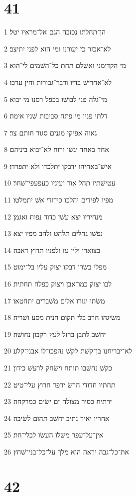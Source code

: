\chapter{41}

\par 1 הן־תחלתו נכזבה הגם אל־מראיו יטל׃
\par 2 לא־אכזר כי יעורנו ומי הוא לפני יתיצב׃
\par 3 מי הקדימני ואשׁלם תחת כל־השׁמים לי־הוא׃
\par 4 לא־אחרישׁ בדיו ודבר־גבורות וחין ערכו׃
\par 5 מי־גלה פני לבושׁו בכפל רסנו מי יבוא׃
\par 6 דלתי פניו מי פתח סביבות שׁניו אימה׃
\par 7 גאוה אפיקי מגנים סגור חותם צר׃
\par 8 אחד באחד יגשׁו ורוח לא־יבוא ביניהם׃
\par 9 אישׁ־באחיהו ידבקו יתלכדו ולא יתפרדו׃
\par 10 עטישׁתיו תהל אור ועיניו כעפעפי־שׁחר׃
\par 11 מפיו לפידים יהלכו כידודי אשׁ יתמלטו׃
\par 12 מנחיריו יצא עשׁן כדוד נפוח ואגמן׃
\par 13 נפשׁו גחלים תלהט ולהב מפיו יצא׃
\par 14 בצוארו ילין עז ולפניו תדוץ דאבה׃
\par 15 מפלי בשׂרו דבקו יצוק עליו בל־ימוט׃
\par 16 לבו יצוק כמו־אבן ויצוק כפלח תחתית׃
\par 17 משׂתו יגורו אלים משׁברים יתחטאו׃
\par 18 משׂיגהו חרב בלי תקום חנית מסע ושׁריה׃
\par 19 יחשׁב לתבן ברזל לעץ רקבון נחושׁה׃
\par 20 לא־יבריחנו בן־קשׁת לקשׁ נהפכו־לו אבני־קלע׃
\par 21 כקשׁ נחשׁבו תותח וישׂחק לרעשׁ כידון׃
\par 22 תחתיו חדודי חרשׂ ירפד חרוץ עלי־טיט׃
\par 23 ירתיח כסיר מצולה ים ישׂים כמרקחה׃
\par 24 אחריו יאיר נתיב יחשׁב תהום לשׂיבה׃
\par 25 אין־על־עפר משׁלו העשׂו לבלי־חת׃
\par 26 את־כל־גבה יראה הוא מלך על־כל־בני־שׁחץ׃

\chapter{42}

